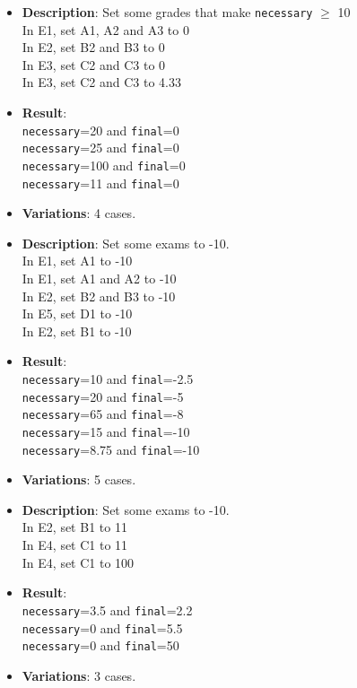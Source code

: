 \vfill
{}
\begin{itemize}[noitemsep]
    \item \textbf{Description}: Set some grades that make \texttt{necessary} $\geq$ 10\\
        In E1, set A1, A2 and A3 to 0 \\
        In E2, set B2 and B3 to 0 \\
        In E3, set C2 and C3 to 0 \\
        In E3, set C2 and C3 to 4.33 
    \item \textbf{Result}: \\
        \texttt{necessary}=20 and \texttt{final}=0 \\
        \texttt{necessary}=25 and \texttt{final}=0 \\
        \texttt{necessary}=100 and \texttt{final}=0 \\
        \texttt{necessary}=11 and \texttt{final}=0
    \item \textbf{Variations}: 4 cases.
\end{itemize}
\vfill
{}
\begin{itemize}[noitemsep]
    \item \textbf{Description}: Set some exams to -10. \\
        In E1, set A1 to -10 \\
        In E1, set A1 and A2 to -10 \\
        In E2, set B2 and B3 to -10 \\
        In E5, set D1 to -10 \\
        In E2, set B1 to -10
    \item \textbf{Result}: \\
        \texttt{necessary}=10 and \texttt{final}=-2.5 \\
        \texttt{necessary}=20 and \texttt{final}=-5 \\
        \texttt{necessary}=65 and \texttt{final}=-8 \\
        \texttt{necessary}=15 and \texttt{final}=-10 \\
        \texttt{necessary}=8.75 and \texttt{final}=-10  
    \item \textbf{Variations}: 5 cases.
\end{itemize}
\vfill
{}
\begin{itemize}[noitemsep]
    \item \textbf{Description}: Set some exams to -10. \\
        In E2, set B1 to 11 \\
        In E4, set C1 to 11 \\
        In E4, set C1 to 100 
    \item \textbf{Result}: \\
        \texttt{necessary}=3.5 and \texttt{final}=2.2 \\
        \texttt{necessary}=0 and \texttt{final}=5.5 \\
        \texttt{necessary}=0 and \texttt{final}=50 
    \item \textbf{Variations}: 3 cases.
\end{itemize}
